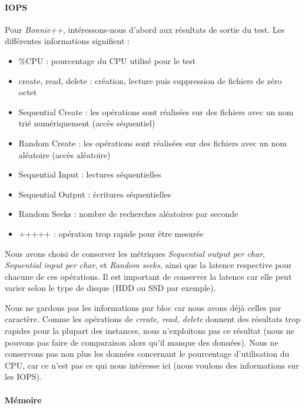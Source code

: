 \paragraph{IOPS} Pour \textit{Bonnie++}, intéressons-nous d'abord aux résultats de sortie du test. Les différentes informations signifient :
\begin{itemize}
  \item \%CPU : pourcentage du CPU utilisé pour le test
  \item create, read, delete : création, lecture puis suppression de fichiers de zéro octet
  \item Sequential Create : les opérations sont réalisées sur des fichiers avec un nom trié numériquement (accès séquentiel)
  \item Random Create : les opérations sont réalisées sur des fichiers avec un nom aléatoire (accès aléatoire)
  \item Sequential Input : lectures séquentielles
  \item Sequential Output : écritures séquentielles
  \item Random Seeks : nombre de recherches aléatoires par seconde
  \item +++++ : opération trop rapide pour être mesurée
\end{itemize}

Nous avons choisi de conserver les métriques \textit{Sequential output per char}, \textit{Sequential input per char}, et \textit{Random seeks}, ainsi que la latence respective pour chacune de ces opérations. Il est important de conserver la latence car elle peut varier selon le type de disque (HDD ou SSD par exemple). 

Nous ne gardons pas les informations par bloc car nous avons déjà celles par caractère. Comme les opérations de \textit{create, read, delete} donnent des résultats trop rapides pour la plupart des instances, nous n'exploitons pas ce résultat (nous ne pouvons pas faire de comparaison alors qu'il manque des données). Nous ne conservons pas non plus les données concernant le pourcentage d'utilisation du CPU, car ce n'est pas ce qui nous intéresse ici (nous voulons des informations sur les IOPS).

\paragraph{Mémoire}


